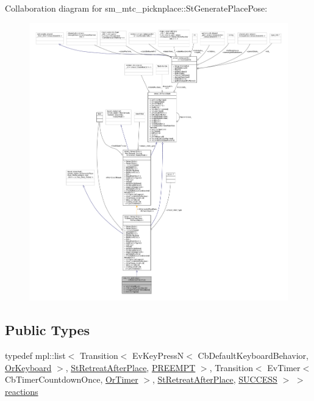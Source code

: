 Collaboration diagram for sm\+\_\+mtc\+\_\+picknplace\+:\+:St\+Generate\+Place\+Pose\+:
\nopagebreak
\begin{figure}[H]
\begin{center}
\leavevmode
\includegraphics[width=350pt]{structsm__mtc__picknplace_1_1StGeneratePlacePose__coll__graph}
\end{center}
\end{figure}
\subsection*{Public Types}
\begin{DoxyCompactItemize}
\item 
typedef mpl\+::list$<$ Transition$<$ Ev\+Key\+PressN$<$ Cb\+Default\+Keyboard\+Behavior, \hyperlink{classsm__mtc__picknplace_1_1OrKeyboard}{Or\+Keyboard} $>$, \hyperlink{structsm__mtc__picknplace_1_1StRetreatAfterPlace}{St\+Retreat\+After\+Place}, \hyperlink{classPREEMPT}{P\+R\+E\+E\+M\+PT} $>$, Transition$<$ Ev\+Timer$<$ Cb\+Timer\+Countdown\+Once, \hyperlink{classsm__mtc__picknplace_1_1OrTimer}{Or\+Timer} $>$, \hyperlink{structsm__mtc__picknplace_1_1StRetreatAfterPlace}{St\+Retreat\+After\+Place}, \hyperlink{classSUCCESS}{S\+U\+C\+C\+E\+SS} $>$ $>$ \hyperlink{structsm__mtc__picknplace_1_1StGeneratePlacePose_a2bfa3dcbc33e47fdc4d8c918cfdcdbe7}{reactions}
\end{DoxyCompactItemize}
